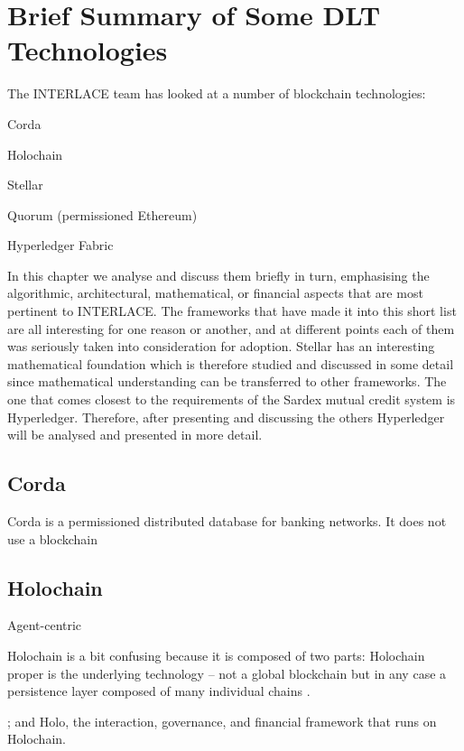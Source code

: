 \section{Brief Summary of Some DLT Technologies}

The INTERLACE team has looked at a number of blockchain technologies:
\begin{packed_item1}
\item Corda
\item Holochain
\item Stellar
\item Quorum (permissioned Ethereum)
\item Hyperledger Fabric
\end{packed_item1}
In this chapter we analyse and discuss them briefly in turn, emphasising the algorithmic, architectural,  mathematical, or financial aspects that are most pertinent to INTERLACE. The frameworks that have made it into this short list are all interesting for one reason or another, and at different points each of them was seriously taken into consideration for adoption. Stellar has an interesting mathematical foundation which is therefore studied and discussed in some detail since mathematical understanding can be transferred to other frameworks. The one that comes closest to the requirements of the Sardex mutual credit system is Hyperledger. Therefore, after presenting and discussing the others Hyperledger will be analysed and presented in more detail.


\subsection{Corda}
Corda \cite{Hearn2016} is a permissioned distributed database for banking networks. It does not use a blockchain



\subsection{Holochain}
Agent-centric


Holochain is a bit confusing because it is composed of two parts: Holochain proper is the underlying technology -- not a global blockchain but in any case a persistence layer composed of many individual chains \cite{HarrisBrownEtAl2018}.

; and Holo, the interaction, governance, and financial framework that runs on Holochain.







